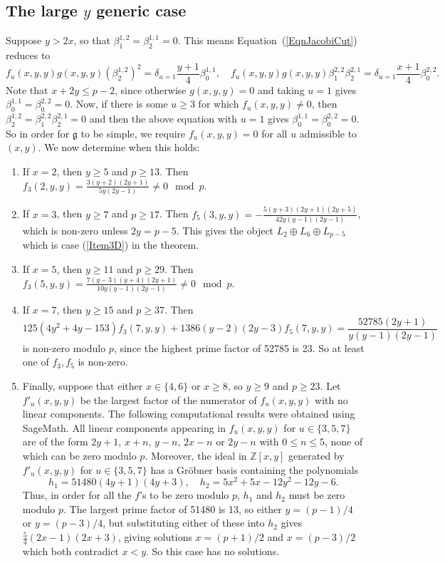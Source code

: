 \documentclass[11pt,a4paper,reqno]{amsart}
\theoremstyle{definition}
\numberwithin{equation}{section}
\newcommand{\mZ}{\mathbb{Z}}
\newcommand{\fg}{\mathfrak{g}}
\begin{document}
\subsection{The large $y$ generic case}\label{SecGeneric1} Suppose $y>2x$, so that $\beta^{1,2}_1=\beta^{1,1}_2=0$. This means Equation~(\ref{EqnJacobiCut}) reduces to
\[f_u(x,y,y)g(x,y,y)(\beta^{1,2}_2)^2=\delta_{u=1}\frac{y+1}4\beta^{1,1}_0,\quad f_u(x,y,y)g(x,y,y)\beta^{2,2}_1\beta^{2,1}_2=\delta_{u=1}\frac{x+1}4\beta^{2,2}_0.\]
Note that $x+2y\leq p-2$, since otherwise $g(x,y,y)=0$ and taking $u=1$ gives $\beta^{1,1}_0=\beta^{2,2}_0=0$. Now, if there is some $u\geq3$ for which $f_u(x,y,y)\neq0$, then $\beta^{1,2}_2=\beta^{2,2}_1\beta^{2,1}_2=0$ and then the above equation with $u=1$ gives $\beta^{1,1}_0=\beta^{2,2}_0=0$. So in order for $\fg$ to be simple, we require $f_u(x,y,y)=0$ for all $u$ admissible to $(x,y)$. We now determine when this holds:
\begin{enumerate}
\item If $x=2$, then $y\geq5$ and $p\geq13$. Then $f_3(2,y,y)=\frac{3(y+2)(2y+1)}{5y(2y-1)}\neq0\mod p$.
\item If $x=3$, then $y\geq7$ and $p\geq17$. Then $f_5(3,y,y)=-\frac{5(y+3)(2y+1)(2y+5)}{42y(y-1)(2y-1)}$, which is non-zero unless $2y=p-5$. This gives the object $L_2\oplus L_6\oplus L_{p-5}$ which is case (\ref{Item3D}) in the theorem.
\item If $x=5$, then $y\geq11$ and $p\geq29$. Then $f_3(5,y,y)=\frac{7(y-3)(y+4)(2y+1)}{10y(y-1)(2y-1)}\neq0\mod p$.
\item If $x=7$, then $y\geq15$ and $p\geq37$. Then
\[125(4y^2+4y-153)f_3(7,y,y)+1386(y-2)(2y-3)f_5(7,y,y)=\frac{52785(2y+1)}{y(y-1)(2y-1)}\]
is non-zero modulo $p$, since the highest prime factor of 52785 is 23. So at least one of $f_3,f_5$ is non-zero.
\item Finally, suppose that either $x\in\{4,6\}$ or $x\geq8$, so $y\geq9$ and $p\geq23$. Let $f'_u(x,y,y)$ be the largest factor of the numerator of $f_u(x,y,y)$ with no linear components. The following computational results were obtained using SageMath. All linear components appearing in $f_u(x,y,y)$ for $u\in\{3,5,7\}$ are of the form $2y+1$, $x+n$, $y-n$, $2x-n$ or $2y-n$ with $0\leq n\leq 5$, none of which can be zero modulo $p$. Moreover, the ideal in $\mZ[x,y]$ generated by $f'_u(x,y,y)$ for $u\in\{3,5,7\}$ has a Gr\"obner basis containing the polynomials
\[h_1=51480(4y+1)(4y+3),\quad h_2=5x^2+5x-12y^2-12y-6.\]
Thus, in order for all the $f$'s to be zero modulo $p$, $h_1$ and $h_2$ must be zero modulo $p$. The largest prime factor of 51480 is 13, so either $y=(p-1)/4$ or $y=(p-3)/4$, but substituting either of these into $h_2$ gives $\frac54(2x-1)(2x+3)$, giving solutions $x=(p+1)/2$ and $x=(p-3)/2$ which both contradict $x<y$. So this case has no solutions.
\end{enumerate}
\end{document}
